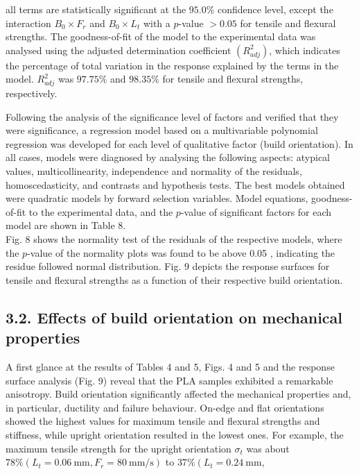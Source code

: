 \documentclass[10pt]{article}
\begin{document}
all terms are statistically significant at the $95.0 \%$ confidence level, except the interaction $B_{0} \times F_{r}$ and $B_{0} \times L_{t}$ with a $p$-value $>0.05$ for tensile and flexural strengths. The goodness-of-fit of the model to the experimental data was analysed using the adjusted determination coefficient $\left(R_{a d j}^{2}\right)$, which indicates the percentage of total variation in the response explained by the terms in the model. $R_{a d j}^{2}$ was $97.75 \%$ and $98.35 \%$ for tensile and flexural strengths, respectively.

Following the analysis of the significance level of factors and verified that they were significance, a regression model based on a multivariable polynomial regression was developed for each level of qualitative factor (build orientation). In all cases, models were diagnosed by analysing the following aspects: atypical values, multicollinearity, independence and normality of the residuals, homoscedasticity, and contrasts and hypothesis tests. The best models obtained were quadratic models by forward selection variables. Model equations, goodness-of-fit to the experimental data, and the $p$-value of significant factors for each model are shown in Table 8.\\
Fig. 8 shows the normality test of the residuals of the respective models, where the $p$-value of the normality plots was found to be above 0.05 , indicating the residue followed normal distribution. Fig. 9 depicts the response surfaces for tensile and flexural strengths as a function of their respective build orientation.

\subsection*{3.2. Effects of build orientation on mechanical properties}
A first glance at the results of Tables 4 and 5, Figs. 4 and 5 and the response surface analysis (Fig. 9) reveal that the PLA samples exhibited a remarkable anisotropy. Build orientation significantly affected the mechanical properties and, in particular, ductility and failure behaviour. On-edge and flat orientations showed the highest values for maximum tensile and flexural strengths and stiffness, while upright orientation resulted in the lowest ones. For example, the maximum tensile strength for the upright orientation $\sigma_{t}$ was about $78 \%\left(L_{t}=0.06 \mathrm{~mm}, F_{r}=80 \mathrm{~mm} / \mathrm{s}\right)$ to $37 \%\left(L_{t}=0.24 \mathrm{~mm}\right.$,
\end{document}
